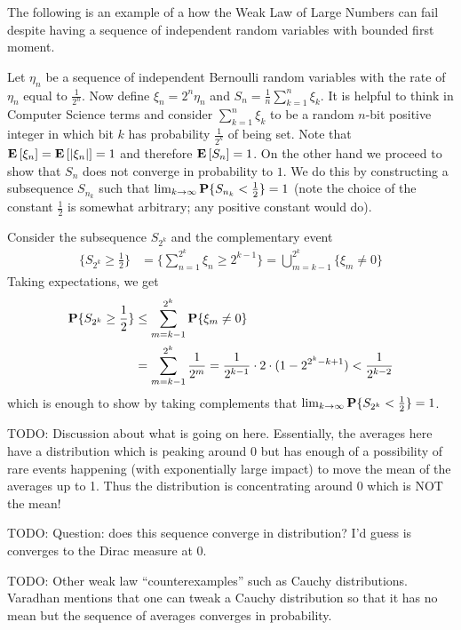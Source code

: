 \begin{examp}\label{WLLNCounterExampleBoundedFirstMoment}The following is an example of a how the Weak Law of
  Large Numbers can fail despite having a sequence of independent
  random variables with bounded first moment.

Let $\eta_n$ be a sequence of independent Bernoulli random variables
with the rate of $\eta_n$ equal to $\frac{1}{2^n}$.  Now define $\xi_n
= 2^n \eta_n$ and $S_n = \frac{1}{n}\sum_{k=1}^n \xi_k$.  It is
helpful to think in Computer Science terms and consider $\sum_{k=1}^n
\xi_k$ to be a random $n$-bit positive integer in which bit $k$ has
probability $\frac{1}{2^k}$ of being set.  Note that
$\textbf{E}\left[\xi_n\right] = \textbf{E}\left[\left \vert \xi_n \right \vert\right]  = 1$ and therefore
$\textbf{E}\left[S_n\right] = 1$.  On the other hand we proceed to show that
$S_n$ does not converge in probability to $1$.  We do this by
constructing a subsequence $S_{n_k}$ such that 
$\lim_{k \to \infty} \textbf{P}\{ S_{n_k} < \frac{1}{2}\} = 1$ (note
the choice of the constant $\frac{1}{2}$ is somewhat arbitrary; any
positive constant would do).

Consider the subsequence $S_{2^k}$ and the complementary event 
\begin{align*}
\lbrace S_{2^k} \geq  \frac{1}{2} \rbrace &= \lbrace
\sum_{n=1}^{2^k}\xi_n \geq  2^{k-1} \rbrace = \bigcup_{m=k-1}^{2^k}
\lbrace \xi_m \neq 0 \rbrace
\end{align*}
Taking expectations, we get 
\begin{align*}
\textbf{P}\{ S_{2^k} \geq  \frac{1}{2} \} &\leq \sum_{m=k-1}^{2^k}
\textbf{P}\{ \xi_m \neq 0 \} \\
&= \sum_{m=k-1}^{2^k} \frac{1}{2^m} = \frac{1}{2^{k-1}} \cdot 2 \cdot
(1 - 2^{2^k - k + 1}) < \frac{1}{2^{k-2}}
\end{align*}
which is enough to show by taking complements that $\lim_{k \to \infty} \textbf{P}\{
  S_{2^k} <  \frac{1}{2} \} = 1$.

TODO: Discussion about what is going on here.   Essentially, the
averages here have a distribution which is peaking around 0 but has
enough of a possibility of rare events happening (with exponentially
large impact) to move the mean of
the averages up to 1.  Thus the distribution is concentrating around 0
which is NOT the mean!

TODO: Question: does this sequence converge in distribution?  I'd
guess is converges to the Dirac measure at 0.
\end{examp}

TODO: Other weak law ``counterexamples'' such as Cauchy
distributions.  Varadhan mentions that one can tweak a Cauchy
distribution so that it has no mean but the sequence of averages
converges in probability.


